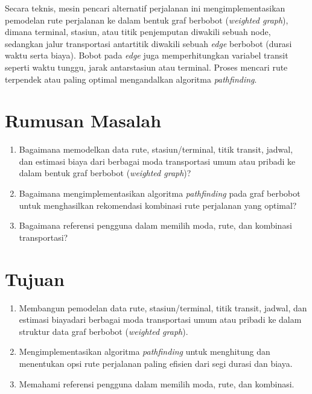 	Secara teknis, mesin pencari alternatif perjalanan ini mengimplementasikan pemodelan rute perjalanan ke dalam bentuk graf berbobot ({\it weighted graph}), dimana terminal, stasiun, atau titik penjemputan diwakili sebuah node, sedangkan jalur transportasi antartitik diwakili sebuah {\it edge} berbobot (durasi waktu serta biaya). Bobot pada \textit{edge} juga memperhitungkan variabel transit seperti waktu tunggu, jarak antarstasiun atau terminal. Proses mencari rute terpendek atau paling optimal mengandalkan algoritma \textit{pathfinding}.

\section{Rumusan Masalah}
\label{sec:rumusan}
\begin{enumerate}
	    \item Bagaimana memodelkan data rute, stasiun/terminal, titik transit, jadwal, dan estimasi biaya dari berbagai moda transportasi umum atau pribadi ke dalam bentuk graf berbobot (\textit{weighted graph})?
        \item Bagaimana mengimplementasikan algoritma \textit{pathfinding} pada graf berbobot untuk menghasilkan rekomendasi kombinasi rute perjalanan yang optimal?
        \item Bagaimana referensi pengguna dalam memilih moda, rute, dan kombinasi transportasi?
	\end{enumerate}

\section{Tujuan}
\label{sec:tujuan}
\begin{enumerate}
	    \item Membangun pemodelan data rute, stasiun/terminal, titik transit, jadwal, dan estimasi biayadari berbagai moda transportasi umum atau pribadi ke dalam struktur data graf berbobot (\textit{weighted graph}).
        \item Mengimplementasikan algoritma \textit{pathfinding} untuk menghitung dan menentukan opsi rute perjalanan paling efisien dari segi durasi dan biaya.
        \item Memahami referensi pengguna dalam memilih moda, rute, dan kombinasi.
	\end{enumerate}

